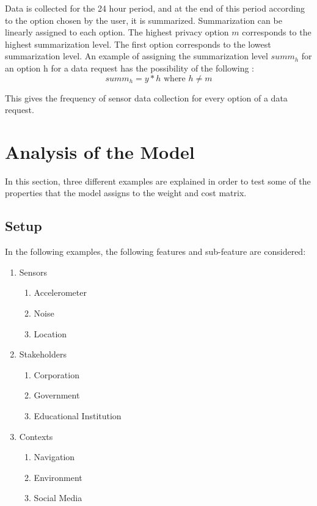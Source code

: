 Data is collected for the 24 hour period, and at the end of this period according to the option chosen by the user, it is summarized. Summarization can
be linearly assigned to each option.
The highest privacy option $m$ corresponds to the highest summarization level. The first option corresponds to the lowest summarization level. An example of assigning the summarization level $summ_{h}$ for an option h for a data request has the possibility of the following :
\begin{equation}
summ_{h} = y*h \text{ where } h \neq m
\end{equation}

This gives the frequency of sensor data collection for every option of a data request.

\section{Analysis of the Model} \label{analysis_model}
In this section, three different examples are explained in order to test some of the properties that the model assigns to the 
weight and cost matrix.

\subsection{Setup}
In the following examples, the following features and sub-feature are considered:

\begin{enumerate}
    \item Sensors
    \begin{enumerate}
    \item Accelerometer 
    \item Noise 
    \item Location 
   \end{enumerate}
    \item Stakeholders 
    \begin{enumerate}
    \item Corporation 
    \item Government 
    \item Educational Institution 
   \end{enumerate}
   \item Contexts
    \begin{enumerate}
    \item Navigation 
    \item Environment 
    \item Social Media 
   \end{enumerate}
 \end{enumerate}
 
